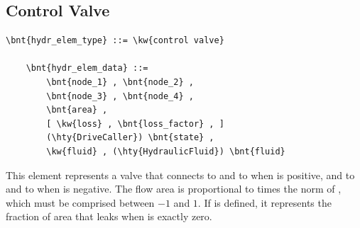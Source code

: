 \subsection{Control Valve}
\label{sec:EL:HYDR:CONTROL_VALVE}
\begin{Verbatim}[commandchars=\\\{\}]
    \bnt{hydr_elem_type} ::= \kw{control valve}

    \bnt{hydr_elem_data} ::=
        \bnt{node_1} , \bnt{node_2} ,
        \bnt{node_3} , \bnt{node_4} ,
        \bnt{area} ,
        [ \kw{loss} , \bnt{loss_factor} , ]
        (\hty{DriveCaller}) \bnt{state} ,
        \kw{fluid} , (\hty{HydraulicFluid}) \bnt{fluid}
\end{Verbatim}
This element represents a valve that connects
 to  and  to 
when  is positive, and  to 
and  to  when  is negative.
The flow area is proportional to  times the norm of ,
which must be comprised between $-1$ and $1$.
If  is defined, it represents the fraction
of area that leaks when  is exactly zero.



